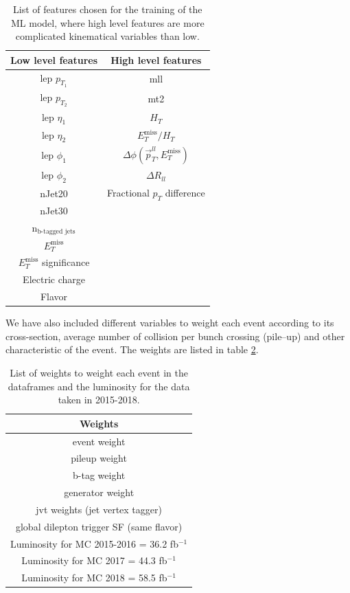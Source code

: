 \begin{table}[H]
    \centering
    \renewcommand{\arraystretch}{1.}
    \begin{tabular}{c c}
    \toprule
    \textbf{Low level features} & \textbf{High level features}\\
    \midrule
    \midrule
        lep $p_{T_1}$ & mll\\
        lep $p_{T_2}$ & mt2\\
        lep $\eta_1$ & $H_T$\\
        lep $\eta_2$ & $E_T^{\text{miss}}/H_T$\\
        lep $\phi_1$ & $\Delta \phi(\Vec{p}_T^{ll}, E_T^{\text{miss}})$\\
        lep $\phi_2$ & $\Delta R_{ll}$\\
        nJet20 & Fractional $p_T$ difference\\
        nJet30\\
        n$_{\text{b-tagged jets}}$\\
        $E_T^{\text{miss}}$\\
        $E_T^{\text{miss}}$ significance\\
        Electric charge\\
        Flavor\\
        \bottomrule
    \end{tabular}
    \caption{List of features chosen for the training of the ML model, where high level features are more complicated kinematical variables than low.}
    \label{tab:features}
\end{table}

We have also included different variables to weight each event according to its cross-section, average number of collision per bunch crossing (pile--up) and other characteristic of the event. The weights are listed in table \ref{tab:eventWeights}.

\begin{table}[H]
    \centering
    \renewcommand{\arraystretch}{1.}
    \begin{tabular}{c}
    \toprule
    \textbf{Weights}\\
    \midrule
    \midrule
        event weight  \\
        pileup weight \\
        b-tag weight \\
        generator weight \\
        jvt weights (jet vertex tagger)\\
        global dilepton trigger SF (same flavor)\\
        Luminosity for MC 2015-2016 = 36.2 fb$^{-1}$\\
        Luminosity for MC 2017 = 44.3 fb$^{-1}$\\
        Luminosity for MC 2018 = 58.5 fb$^{-1}$\\
        \bottomrule
    \end{tabular}
    \caption{List of weights to weight each event in the dataframes and the luminosity for the data taken in 2015-2018.}
    \label{tab:eventWeights}
\end{table}

